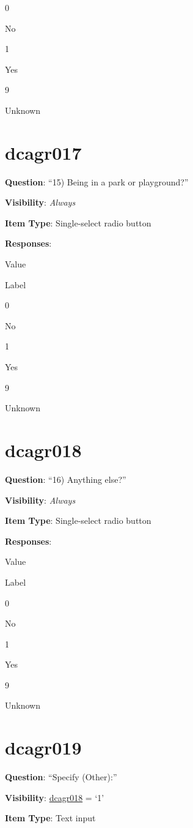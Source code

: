 \documentclass[]{book}
\begin{document}
0

No

1

Yes

9

Unknown

\hypertarget{dcagr017}{%
\section{dcagr017}\label{dcagr017}}

\textbf{Question}: ``15) Being in a park or playground?''

\textbf{Visibility}: \emph{Always}

\textbf{Item Type}: Single-select radio button

\textbf{Responses}:

Value

Label

0

No

1

Yes

9

Unknown

\hypertarget{dcagr018}{%
\section{dcagr018}\label{dcagr018}}

\textbf{Question}: ``16) Anything else?''

\textbf{Visibility}: \emph{Always}

\textbf{Item Type}: Single-select radio button

\textbf{Responses}:

Value

Label

0

No

1

Yes

9

Unknown

\hypertarget{dcagr019}{%
\section{dcagr019}\label{dcagr019}}

\textbf{Question}: ``Specify (Other):''

\textbf{Visibility}: \protect\hyperlink{dcagr018}{dcagr018} = `1'

\textbf{Item Type}: Text input
\end{document}

